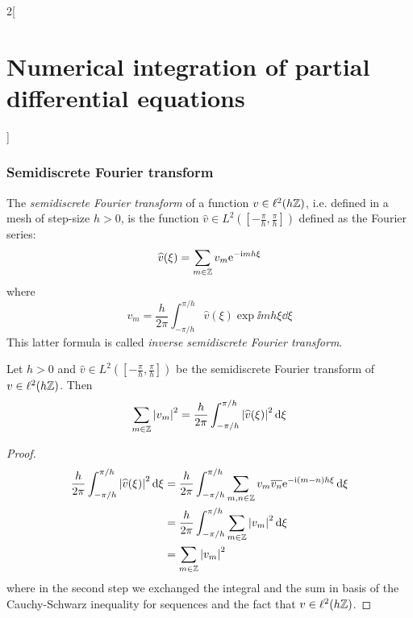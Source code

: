 \documentclass[../../../main_math.tex]{subfiles}
\begin{document}
\begin{multicols}{2}[\section{Numerical integration of partial differential equations}]
  \subsubsection{Semidiscrete Fourier transform}
  \begin{definition}
    The \emph{semidiscrete Fourier transform} of a function $v\in \ell^2 (h\mathbb{Z})$, i.e. defined in a mesh of step-size $h>0$, is the function $\widehat{v}\in L^2\left(\left[-\frac{\pi}{h},\frac{\pi}{h}\right]\right)$ defined as the Fourier series: $$\widehat{v}(\xi)=\sum_{m\in\mathbb{Z}}v_m\mathrm{e}^{-\mathrm{i} m h \xi}$$
    where $$v_m=\frac{h}{2\pi}\int_{-\pi/h}^{\pi/h} \widehat{v}(\xi)\exp{\ii mh \xi}\dd{\xi}$$
    This latter formula is called \emph{inverse semidiscrete Fourier transform}.
  \end{definition}
  \begin{proposition}\label{NIPDE:parseval}
    Let $h>0$ and $\widehat{v}\in L^2\left(\left[-\frac{\pi}{h},\frac{\pi}{h}\right]\right)$ be the semidiscrete Fourier transform of $v\in \ell^2 (h\mathbb{Z})$. Then $$\sum_{m\in\mathbb{Z}}\abs{v_m}^2=\frac{h}{2\pi}\int_{-\pi/h}^{\pi/h} \abs{\widehat{v}(\xi)}^2\dd{\xi}$$
  \end{proposition}
  \begin{proof}
    \begin{align*}
      \frac{h}{2\pi}\int_{-\pi/h}^{\pi/h} \abs{\widehat{v}(\xi)}^2\dd{\xi} & =\frac{h}{2\pi}\int_{-\pi/h}^{\pi/h} \sum_{m,n\in\mathbb{Z}}v_m\overline{v_n}\mathrm{e}^{-\mathrm{i} (m -n)h \xi}\dd{\xi} \\
                                                                           & =\frac{h}{2\pi}\int_{-\pi/h}^{\pi/h} \sum_{m\in\mathbb{Z}}\abs{v_m}^2\dd{\xi}                               \\
                                                                           & =\sum_{m\in\mathbb{Z}}\abs{v_m}^2
    \end{align*}
    where in the second step we exchanged the integral and the sum in basis of the Cauchy-Schwarz inequality for sequences and the fact that $v\in \ell^2 (h\mathbb{Z})$.
  \end{proof}

\end{multicols}
\end{document}
